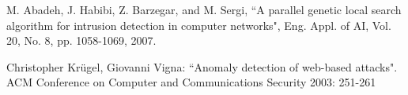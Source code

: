 \documentclass[10pt, conference, compsocconf]{IEEEtran}
\begin{document}
\begin{thebibliography}{1}
	M. Abadeh, J. Habibi, Z. Barzegar, and M. Sergi, ``A parallel genetic local search algorithm for intrusion detection in computer networks", Eng. Appl. of AI, Vol. 20, No. 8, pp. 1058-1069, 2007.

 Christopher Krügel, Giovanni Vigna: ``Anomaly detection of web-based attacks". ACM Conference on Computer and Communications Security 2003: 251-261





\end{thebibliography}




\end{document}
